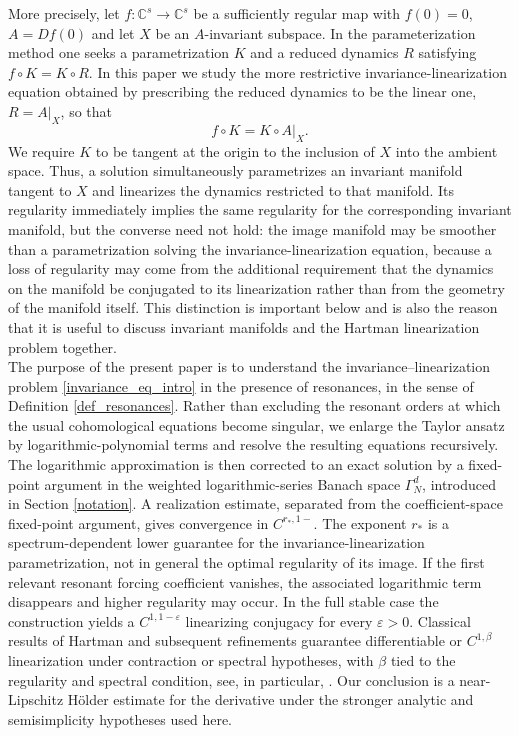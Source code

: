 \documentclass{amsart}
\theoremstyle{plain}
\theoremstyle{definition}
\begin{document}
More precisely, let $f:\mathbb{C}^s\to\mathbb{C}^s$ be a sufficiently regular map with $f(0)=0$, $A=Df(0)$ and let $X$ be an $A$-invariant subspace. In the parameterization method one seeks a parametrization $K$ and a reduced dynamics $R$ satisfying $f\circ K=K\circ R$. In this paper we study the more restrictive invariance-linearization equation obtained by prescribing the reduced dynamics to be the linear one, $R=A|_X$, so that
\begin{equation}\label{invariance_eq_intro}
        f\circ K=K\circ A|_X.
\end{equation}
We require $K$ to be tangent at the origin to the inclusion of $X$ into the ambient space. Thus, a solution simultaneously parametrizes an invariant manifold tangent to $X$ and linearizes the dynamics restricted to that manifold. Its regularity immediately implies the same regularity for the corresponding invariant manifold, but the converse need not hold: the image manifold may be smoother than a parametrization solving the invariance-linearization equation, because a loss of regularity may come from the additional requirement that the dynamics on the manifold be conjugated to its linearization rather than from the geometry of the manifold itself. This distinction is important below and is also the reason that it is useful to discuss invariant manifolds and the Hartman linearization problem together.\\


The purpose of the present paper is to understand the invariance--linearization problem \eqref{invariance_eq_intro} in the presence of resonances, in the sense of Definition \ref{def_resonances}. Rather than excluding the resonant orders at which the usual cohomological equations become singular, we enlarge the Taylor ansatz by logarithmic-polynomial terms and resolve the resulting equations recursively. The logarithmic approximation is then corrected to an exact solution by a fixed-point argument in the weighted logarithmic-series Banach space $\Gamma_N^d$, introduced in Section \ref{notation}. A realization estimate, separated from the coefficient-space fixed-point argument, gives convergence in $C^{r_*,1-}$. The exponent $r_*$ is a spectrum-dependent lower guarantee for the invariance-linearization parametrization, not in general the optimal regularity of its image. If the first relevant resonant forcing coefficient vanishes, the associated logarithmic term disappears and higher regularity may occur. In the full stable case the construction yields a $C^{1,1-\varepsilon}$ linearizing conjugacy for every $\varepsilon>0$. Classical results of Hartman and subsequent refinements guarantee differentiable or $C^{1,\beta}$ linearization under contraction or spectral hypotheses, with $\beta$ tied to the regularity and spectral condition, see, in particular, \cite{hartman1960local,newhouse2017hartman,zhang2017differentiability}. Our conclusion is a near-Lipschitz H\"older estimate for the derivative under the stronger analytic and semisimplicity hypotheses used here.\\
\end{document}
